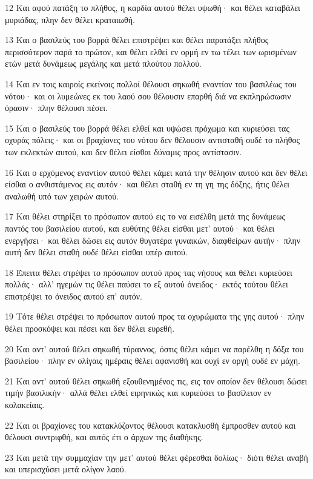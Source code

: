 \par 12 Και αφού πατάξη το πλήθος, η καρδία αυτού θέλει υψωθή· και θέλει καταβάλει μυριάδας, πλην δεν θέλει κραταιωθή.
\par 13 Και ο βασιλεύς του βορρά θέλει επιστρέψει και θέλει παρατάξει πλήθος περισσότερον παρά το πρώτον, και θέλει ελθεί εν ορμή εν τω τέλει των ωρισμένων ετών μετά δυνάμεως μεγάλης και μετά πλούτου πολλού.
\par 14 Και εν τοις καιροίς εκείνοις πολλοί θέλουσι σηκωθή εναντίον του βασιλέως του νότου· και οι λυμεώνες εκ του λαού σου θέλουσιν επαρθή διά να εκπληρώσωσιν όρασιν· πλην θέλουσι πέσει.
\par 15 Και ο βασιλεύς του βορρά θέλει ελθεί και υψώσει πρόχωμα και κυριεύσει τας οχυράς πόλεις· και οι βραχίονες του νότου δεν θέλουσιν αντισταθή ουδέ το πλήθος των εκλεκτών αυτού, και δεν θέλει είσθαι δύναμις προς αντίστασιν.
\par 16 Και ο ερχόμενος εναντίον αυτού θέλει κάμει κατά την θέλησιν αυτού και δεν θέλει είσθαι ο ανθιστάμενος εις αυτόν· και θέλει σταθή εν τη γη της δόξης, ήτις θέλει αναλωθή υπό των χειρών αυτού.
\par 17 Και θέλει στηρίξει το πρόσωπον αυτού εις το να εισέλθη μετά της δυνάμεως παντός του βασιλείου αυτού, και ευθύτης θέλει είσθαι μετ' αυτού· και θέλει ενεργήσει· και θέλει δώσει εις αυτόν θυγατέρα γυναικών, διαφθείρων αυτήν· πλην αυτή δεν θέλει σταθή ουδέ θέλει είσθαι υπέρ αυτού.
\par 18 Έπειτα θέλει στρέψει το πρόσωπον αυτού προς τας νήσους και θέλει κυριεύσει πολλάς· αλλ' ηγεμών τις θέλει παύσει το εξ αυτού όνειδος· εκτός τούτου θέλει επιστρέψει το όνειδος αυτού επ' αυτόν.
\par 19 Τότε θέλει στρέψει το πρόσωπον αυτού προς τα οχυρώματα της γης αυτού· πλην θέλει προσκόψει και πέσει και δεν θέλει ευρεθή.
\par 20 Και αντ' αυτού θέλει σηκωθή τύραννος, όστις θέλει κάμει να παρέλθη η δόξα του βασιλείου· πλην εν ολίγαις ημέραις θέλει αφανισθή και ουχί εν οργή ουδέ εν μάχη.
\par 21 Και αντ' αυτού θέλει σηκωθή εξουθενημένος τις, εις τον οποίον δεν θέλουσι δώσει τιμήν βασιλικήν· αλλά θέλει ελθεί ειρηνικώς και κυριεύσει το βασίλειον εν κολακείαις.
\par 22 Και οι βραχίονες του κατακλύζοντος θέλουσι κατακλυσθή έμπροσθεν αυτού και θέλουσι συντριφθή, και αυτός έτι ο άρχων της διαθήκης.
\par 23 Και μετά την συμμαχίαν την μετ' αυτού θέλει φέρεσθαι δολίως· διότι θέλει αναβή και υπερισχύσει μετά ολίγον λαού.
